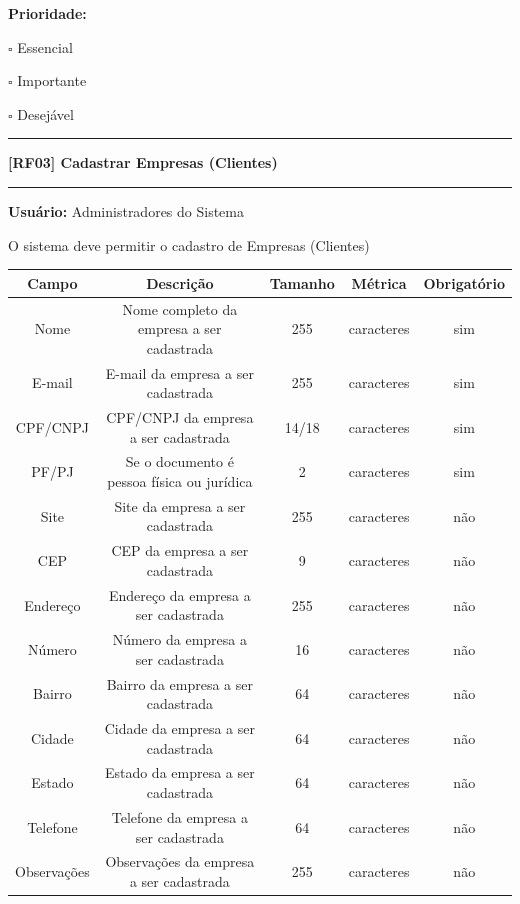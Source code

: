\documentclass{scrreprt}
\begin{document}
	\textbf{Prioridade: }\begin{itemize*}
		\item[\hspace{1cm}\rlap{\raisebox{0.2ex}{\hspace{0.4ex}\scriptsize \ding{56}}}$\square$]
		Essencial
		\item[\hspace{1cm}$\square$]
		Importante
		\item[\hspace{1cm}$\square$]
		Desejável
	\end{itemize*}
	\begin{center}
		\noindent\rule{16cm}{0.4pt}
		\textbf{[RF03] Cadastrar Empresas (Clientes)}
		\noindent\rule{16cm}{0.4pt}
	\end{center}
	\textbf{Usuário:} Administradores do Sistema
	
	O sistema deve permitir o cadastro de Empresas (Clientes)
	
	\begin{center}
		\begin{adjustbox}{width=\textwidth}      \begin{tabular}{ |c|c|c|c|c| } 
				\hline
				\rowcolor{lightgray} Campo & Descrição & Tamanho & Métrica & Obrigatório \\
				\hline
				Nome & Nome completo da empresa a ser cadastrada & 255 & caracteres & sim \\ 
				\hline
				E-mail & E-mail da empresa a ser cadastrada & 255 & caracteres & sim \\ 
				\hline
				CPF/CNPJ & CPF/CNPJ da empresa a ser cadastrada & 14/18 & caracteres & sim \\ 
				\hline
				PF/PJ & Se o documento é pessoa física ou jurídica & 2 & caracteres & sim \\ 
				\hline
				Site & Site da empresa a ser cadastrada & 255 & caracteres & não \\ 
				\hline
				CEP & CEP da empresa a ser cadastrada & 9 & caracteres & não \\ 
				\hline
				Endereço & Endereço da empresa a ser cadastrada & 255 & caracteres & não \\ 
				\hline
				Número & Número da empresa a ser cadastrada & 16 & caracteres & não \\ 
				\hline
				Bairro & Bairro da empresa a ser cadastrada & 64 & caracteres & não \\ 
				\hline
				Cidade & Cidade da empresa a ser cadastrada & 64 & caracteres & não \\ 
				\hline
				Estado & Estado da empresa a ser cadastrada & 64 & caracteres & não \\ 
				\hline
				Telefone & Telefone da empresa a ser cadastrada & 64 & caracteres & não \\ 
				\hline
				Observações & Observações da empresa a ser cadastrada & 255 & caracteres & não \\
				\hline
		\end{tabular}    \end{adjustbox}
	\end{center}
	
\end{document}
